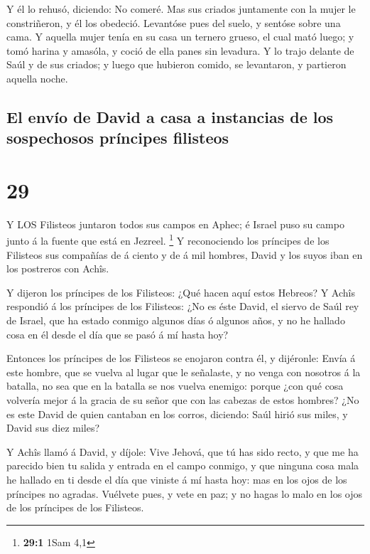  Y él lo rehusó, diciendo: No comeré. Mas sus criados
juntamente con la mujer le constriñeron, y él los obedeció. Levantóse
pues del suelo, y sentóse sobre una cama.  Y aquella mujer
tenía en su casa un ternero grueso, el cual mató luego; y tomó harina y
amasóla, y coció de ella panes sin levadura.  Y lo trajo
delante de Saúl y de sus criados; y luego que hubieron comido, se
levantaron, y partieron aquella noche.

\hypertarget{el-envuxedo-de-david-a-casa-a-instancias-de-los-sospechosos-pruxedncipes-filisteos}{%
\subsection{El envío de David a casa a instancias de los sospechosos
príncipes
filisteos}\label{el-envuxedo-de-david-a-casa-a-instancias-de-los-sospechosos-pruxedncipes-filisteos}}

\hypertarget{section-28}{%
\section{29}\label{section-28}}

 Y LOS Filisteos juntaron todos sus campos en Aphec; é
Israel puso su campo junto á la fuente que está en Jezreel. \footnote{\textbf{29:1}
  1Sam 4,1}  Y reconociendo los príncipes de los Filisteos
sus compañías de á ciento y de á mil hombres, David y los suyos iban en
los postreros con Achîs.

 Y dijeron los príncipes de los Filisteos: ¿Qué hacen aquí
estos Hebreos? Y Achîs respondió á los príncipes de los Filisteos: ¿No
es éste David, el siervo de Saúl rey de Israel, que ha estado conmigo
algunos días ó algunos años, y no he hallado cosa en él desde el día que
se pasó á mí hasta hoy?

 Entonces los príncipes de los Filisteos se enojaron contra
él, y dijéronle: Envía á este hombre, que se vuelva al lugar que le
señalaste, y no venga con nosotros á la batalla, no sea que en la
batalla se nos vuelva enemigo: porque ¿con qué cosa volvería mejor á la
gracia de su señor que con las cabezas de estos hombres? 
¿No es este David de quien cantaban en los corros, diciendo: Saúl hirió
sus miles, y David sus diez miles?

 Y Achîs llamó á David, y díjole: Vive Jehová, que tú has
sido recto, y que me ha parecido bien tu salida y entrada en el campo
conmigo, y que ninguna cosa mala he hallado en ti desde el día que
viniste á mí hasta hoy: mas en los ojos de los príncipes no agradas.
 Vuélvete pues, y vete en paz; y no hagas lo malo en los
ojos de los príncipes de los Filisteos.

